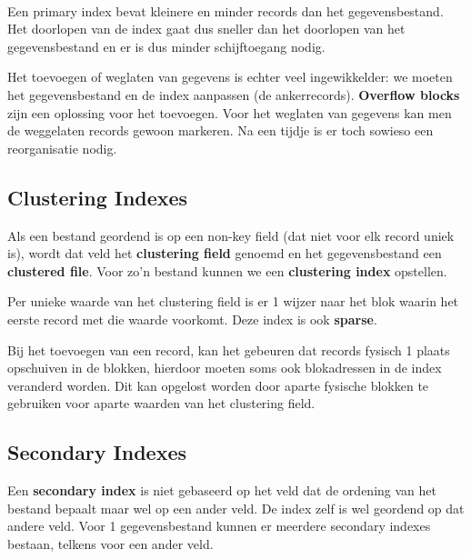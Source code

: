 ~

\noindent Een primary index bevat kleinere en minder records dan het gegevensbestand. Het doorlopen van de index gaat dus sneller dan het doorlopen van het gegevensbestand en er is dus minder schijftoegang nodig.

Het toevoegen of weglaten van gegevens is echter veel ingewikkelder: we moeten het gegevensbestand en de index aanpassen (de ankerrecords). \textbf{Overflow blocks} zijn een oplossing voor het toevoegen. Voor het weglaten van gegevens kan men de weggelaten records gewoon markeren. Na een tijdje is er toch sowieso een reorganisatie nodig.


\subsection{Clustering Indexes}
Als een bestand geordend is op een non-key field (dat niet voor elk record uniek is), wordt dat veld het \textbf{clustering field} genoemd en het gegevensbestand een \textbf{clustered file}. Voor zo'n bestand kunnen we een \textbf{clustering index} opstellen.

Per unieke waarde van het clustering field is er 1 wijzer naar het blok waarin het eerste record met die waarde voorkomt. Deze index is ook \textbf{sparse}.

Bij het toevoegen van een record, kan het gebeuren dat records fysisch 1 plaats opschuiven in de blokken, hierdoor moeten soms ook blokadressen in de index veranderd worden. Dit kan opgelost worden door aparte fysische blokken te gebruiken voor aparte waarden van het clustering field.


\subsection{Secondary Indexes}
Een \textbf{secondary index} is niet gebaseerd op het veld dat de ordening van het bestand bepaalt maar wel op een ander veld. De index zelf is wel geordend op dat andere veld. Voor 1 gegevensbestand kunnen er meerdere secondary indexes bestaan, telkens voor een ander veld.

